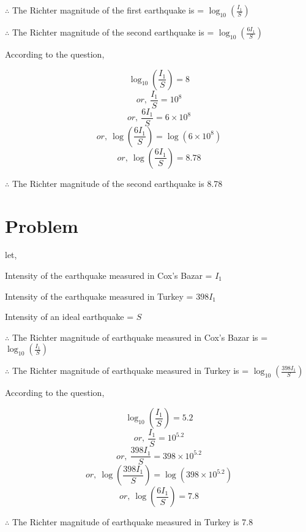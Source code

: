 \documentclass{report}
\begin{document}
$\therefore$ The Richter magnitude of the first earthquake is = $\log_{10}\left(\frac{I_1}{S}\right)$

$\therefore$ The Richter magnitude of the second earthquake is = $\log_{10}\left(\frac{6I_1}{S}\right)$

According to the question,

$$\log_{10}\left(\frac{I_1}{S}\right) = 8 $$
$$or, \: \frac{I_1}{S} = 10^{8} $$
$$or, \: \frac{6I_1}{S} = 6\times10^{8} $$
$$or, \: \log\left(\frac{6I_1}{S}\right) = \log(6\times10^{8}) $$
$$or, \: \log\left(\frac{6I_1}{S}\right) = 8.78 $$

$\therefore$  The Richter magnitude of the second earthquake is 8.78

\section{Problem}

let,

Intensity of the earthquake measured in Cox's Bazar = $I_1$

Intensity of the earthquake measured in Turkey = $398I_1$ 

Intensity of an ideal earthquake = $S$

\hspace{30cm}

$\therefore$ The Richter magnitude of earthquake measured in Cox's Bazar is = $\log_{10}\left(\frac{I_1}{S}\right)$

$\therefore$ The Richter magnitude of earthquake measured in Turkey is = $\log_{10}\left(\frac{398I_1}{S}\right)$

According to the question,

$$\log_{10}\left(\frac{I_1}{S}\right) = 5.2 $$
$$or, \: \frac{I_1}{S} = 10^{5.2} $$
$$or, \: \frac{398I_1}{S} = 398\times10^{5.2} $$
$$or, \: \log\left(\frac{398I_1}{S}\right) = \log(398\times10^{5.2}) $$
$$or, \: \log\left(\frac{6I_1}{S}\right) = 7.8 $$

$\therefore$  The Richter magnitude of earthquake measured in Turkey is  7.8
\end{document}
